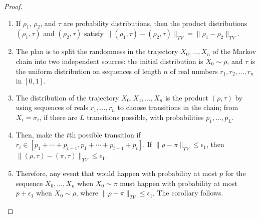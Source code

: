 \documentclass[12pt]{article}
\begin{document}
\begin{proof}
    \begin{enumerate}
        \item
            If \( \rho_1 \), \( \rho_{2} \), and \( \tau \) are
            probability distributions, then the product distributions \(
            (\rho_1 , \tau ) \) and \( (\rho_2 , \tau ) \) satisfy \( \|
            (\rho_1 , \tau )- (\rho_2, \tau )\|_{TV} = \|\rho_1- \rho_2
            \|_{TV} \).
        \item
            The plan is to split the randomness in the trajectory \( X_0,
            \dots , X_n \) of the Markov chain into two independent
            sources:  the initial distribution is \( X_0 \sim \rho \),
            and \( \tau \) is the uniform distribution on sequences of
            length \( n \) of real numbers \( r_1 , r_2, \dots, r_n \)
            in \( [0, 1] \).
        \item
            The distribution of the trajectory \( X_0 , X_1,\dots, X_n \)
            is the product \( (\rho, \tau ) \) by using sequences of
            reals \( r_1, \dots, r_n \) to choose transitions in the
            chain; from \( X_i = \sigma_i \), if there are \( L \)
            transitions possible, with probabilities \( p_1, \dots, p_L \).
        \item
            Then, make the \( t \)th possible transition if \( r_i \in [p_1
            + \cdots + p_{t-1}, p_1 + \cdots + p_{t-1 }+ p_t] \).  If \(
            \|\rho- \pi\|_{TV} \le \epsilon_1 \), then \( \|(\rho, \tau
            )- (\pi, \tau )\|_{TV} \le \epsilon_1 \).
        \item
            Therefore, any event that would happen with probability at
            most \( p \) for the sequence \( X_0 ,\dots, X_n \) when \(
            X_0 \sim \pi \) must happen with probability at most \( p +
            \epsilon_1 \) when \( X_0 \sim \rho \), where \( \|\rho- \pi\|_
            {TV} \le \epsilon_1 \).  The corollary follows.
    \end{enumerate}
\end{proof}
\end{document}
